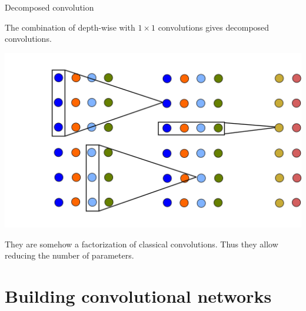 \documentclass[xcolor=pdftex,dvipsnames,table,mathserif]{beamer}
\begin{document}
\begin{frame}{Decomposed convolution}

The combination of depth-wise with $1 \times 1$ convolutions gives decomposed convolutions.

  \begin{center}
    \includegraphics[height=0.66\textheight]{conv_dec.png}
  \end{center}

They are somehow a factorization of classical convolutions. Thus they allow reducing the number of parameters.

\end{frame}



\section{Building convolutional networks}

\end{document}
